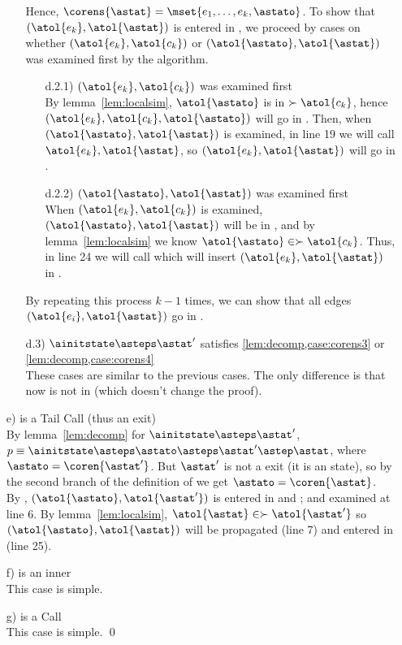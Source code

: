 \documentclass{LMCS}
\theoremstyle{definition} \newtheorem{property}[thm]{Property}
\begin{document}
\begin{enumerate}[$\bullet$]
\begin{enumerate}[$\bullet$]
    Hence, $\corens{\astat} = \mset{e_1, \dots, e_k, \astato}$.
    To show that $(\atol{e_k}, \atol{\astat})$ is entered in \seen,
    we proceed by cases on whether 
    $(\atol{e_k}, \atol{c_k})$ or 
    $(\atol{\astato}, \atol{\astat})$ was examined first by the algorithm.
    \begin{enumerate}[$\bullet$]
    \item[d.2.1)]
      $(\atol{e_k}, \atol{c_k})$ was examined first \\
      By lemma~\ref{lem:localsim},
      $\atol{\astato}$ is in $\succ{\atol{c_k}}$, hence
      $(\atol{e_k}, \atol{c_k}, \atol{\astato})$
      will go in \tcallers.
      Then, when $(\atol{\astato}, \atol{\astat})$ is examined, 
      in line 19 we will call \slp 
      $\atol{e_k}, \atol{\astat}$\srp, so
      $(\atol{e_k}, \atol{\astat})$ will go in \seen.
    \item[d.2.2)]
      $(\atol{\astato}, \atol{\astat})$ was examined first \\
      When $(\atol{e_k}, \atol{c_k})$ is
      examined, $(\atol{\astato}, \atol{\astat})$ will be in \summary,
      and by lemma~\ref{lem:localsim} we know 
      $\atol{\astato} \in \succ{\atol{c_k}}$.
      Thus, in line 24 we will call  which will insert
      $(\atol{e_k}, \atol{\astat})$ in \seen.
    \end{enumerate}
    By repeating this process $k - 1$ times, we can show that all edges
    $(\atol{e_i}, \atol{\astat})$ go in \seen.
  \item[d.3)]
    $\ainitstate \asteps \astat'$ satisfies \ref{lem:decomp,case:corens3}
    or \ref{lem:decomp,case:corens4} \\
    These cases are similar to the previous cases.
    The only difference is that now \ainitstate{} is not in
     (which doesn't change the proof).
  \end{enumerate}
\item[e)]
  \astat{} is a Tail Call (thus an exit) \\
  By lemma~\ref{lem:decomp} for $\ainitstate \asteps \astat'$, 
  $p \equiv \ainitstate \asteps \astato \asteps \astat' \astep 
  \astat$,
  where $\astato = \coren{\astat'}$. 
  But $\astat'$ is not a \daceval{} exit (it is an \daapply{} state), so by the second
  branch of the definition of \dcoren{} we get $\astato = \coren{\astat}$. \\
  By \ih{}, $(\atol{\astato}, \atol{\astat'})$ is entered in \seen{} and
  \work{}; and examined at line 6.
  By lemma~\ref{lem:localsim}, $\atol{\astat} \in \succ{\atol{\astat'}}$ 
  so $(\atol{\astato}, \atol{\astat})$ will be propagated (line 7)
  and entered in \seen{} (line 25).
\item[f)]
  \astat{} is an inner \daceval \\
  This case is simple.
\item[g)]
  \astat{} is a Call \\
  This case is simple.
  \qed
\end{enumerate}
\end{document}

